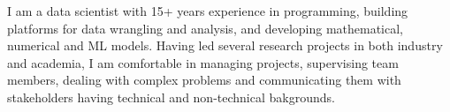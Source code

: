 \documentclass[
	a4paper,
]{fortysecondscv}
\begin{document}
\makefrontsidebar

I am a data scientist with %
15+ years experience in programming, building platforms for data wrangling and analysis, and developing mathematical, numerical and ML models.
Having led several research projects in both industry and academia, I am comfortable in managing projects, supervising team members, dealing with complex problems and communicating them with stakeholders having technical and non-technical bakgrounds.

 
\end{document}
